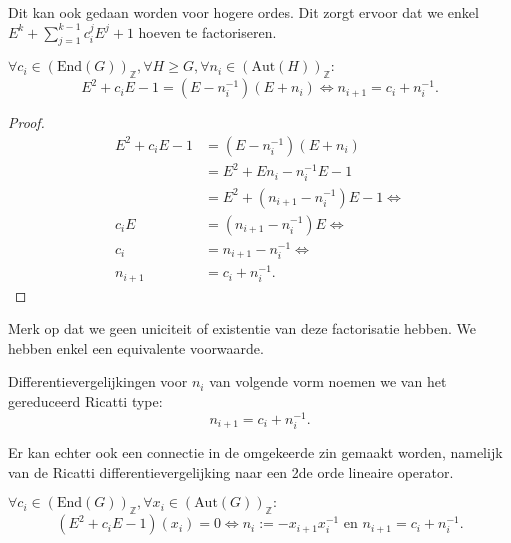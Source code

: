 \documentclass[a4paper,12pt]{article}
\begin{document}
\begin{remark}
    Dit kan ook gedaan worden voor hogere ordes. Dit zorgt ervoor dat we enkel $E^k + \sum_{j=1}^{k-1}c_i^j E^j + 1$ hoeven te factoriseren.
\end{remark}
\begin{theorem}
    \label{connectie ricatti}
    $\forall c_i \in (\text{End}(G))_{\mathbb{Z}}, \forall H \geq G, \forall n_i \in (\text{Aut}(H))_{\mathbb{Z}}:$
    $$
        E^2 +c_i E -1 = (E - n_i^{-1})(E + n_i) \Leftrightarrow n_{i+1} = c_i + n_i^{-1}.
    $$
\end{theorem}

\begin{proof}
    \begin{align*}
        E^2 +c_i E -1 & = (E - n_i^{-1})(E + n_i)                         \\
                      & = E^2 + E n_i - n_i^{-1} E -1                     \\
                      & = E^2 + (n_{i+1} - n_i^{-1}) E -1 \Leftrightarrow \\
        c_i E         & = (n_{i+1} - n_i^{-1}) E \Leftrightarrow          \\
        c_i           & = n_{i+1} - n_i^{-1} \Leftrightarrow              \\
        n_{i+1}       & = c_i + n_i^{-1}.
    \end{align*}

\end{proof}

\begin{remark}
    Merk op dat we geen uniciteit of existentie van deze factorisatie hebben.
    We hebben enkel een equivalente voorwaarde.
\end{remark}

\begin{definition}
    Differentievergelijkingen voor $n_i$ van volgende vorm noemen we van het gereduceerd Ricatti type:
    $$
        n_{i+1} = c_i + n_i^{-1}.
    $$
\end{definition}

\begin{remark}
    Er kan echter ook een connectie in de omgekeerde zin gemaakt worden, namelijk van de Ricatti differentievergelijking naar een 2de orde lineaire operator.
\end{remark}


\begin{theorem}
    $\forall c_i  \in (\text{End}(G))_{\mathbb{Z}}, \forall x_i \in  (\text{Aut}(G))_{\mathbb{Z}}:$
    $$
        (E^2 + c_i E -1)(x_i) = 0 \Leftrightarrow n_i := -x_{i+1}x_i^{-1} \text{ en } n_{i+1} = c_i + n_i^{-1}.
    $$
\end{theorem}
\end{document}
